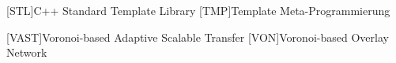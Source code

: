 \begin{acronym}[xxxxxxxxxxxx]
	
	[STL]{C++ Standard Template Library}
	[TMP]{Template Meta-Programmierung}

	[VAST]{Voronoi-based Adaptive Scalable Transfer}
	[VON]{Voronoi-based Overlay Network}





\end{acronym}
